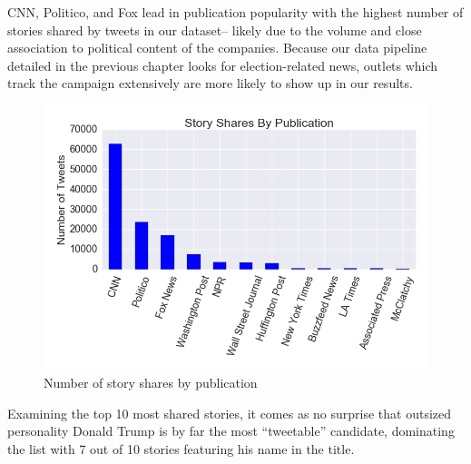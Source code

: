 \documentclass[letterpaper]{article}
\begin{document}
CNN, Politico, and Fox lead in publication popularity with the highest number of stories shared by tweets in our dataset-- likely due to the volume and close association to political content of the companies. Because our data pipeline detailed in the previous chapter looks for election-related news, outlets which track the campaign extensively are more likely to show up in our results.


\begin{figure}[t!]  
\centering 
  \includegraphics[width=\columnwidth]{all-stories-by-pub}  
  \caption{Number of story shares by publication
    \label{fig:tweets-by-pub}}
\end{figure} 


\newpage %

Examining the top 10 most shared stories, it comes as no surprise that outsized personality Donald Trump is by far the most ``tweetable'' candidate, dominating the list with 7 out of 10 stories featuring his name in the title.
\end{document}
